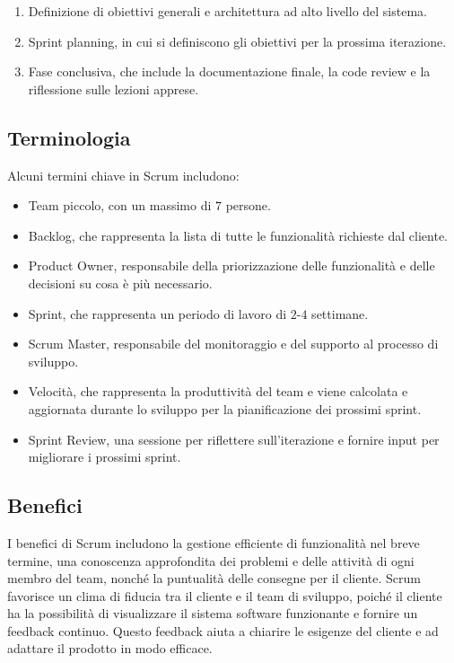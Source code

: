 \begin{enumerate}
    \item Definizione di obiettivi generali e architettura ad alto livello del sistema.
    \item Sprint planning, in cui si definiscono gli obiettivi per la prossima iterazione.
    \item Fase conclusiva, che include la documentazione finale, la code review e la riflessione sulle lezioni apprese.
\end{enumerate}

\subsection{Terminologia}
Alcuni termini chiave in Scrum includono:

\begin{itemize}
    \item Team piccolo, con un massimo di $7$ persone.
    \item Backlog, che rappresenta la lista di tutte le funzionalità richieste dal cliente.
    \item Product Owner, responsabile della priorizzazione delle funzionalità e delle decisioni su cosa è più necessario.
    \item Sprint, che rappresenta un periodo di lavoro di $2$-$4$ settimane.
    \item Scrum Master, responsabile del monitoraggio e del supporto al processo di sviluppo.
    \item Velocità, che rappresenta la produttività del team e viene calcolata e aggiornata durante lo sviluppo per la
    pianificazione dei prossimi sprint.
    \item Sprint Review, una sessione per riflettere sull'iterazione e fornire input per migliorare i prossimi sprint.
\end{itemize}

\subsection{Benefici}
I benefici di Scrum includono la gestione efficiente di funzionalità nel breve termine, una conoscenza approfondita
dei problemi e delle attività di ogni membro del team, nonché la puntualità delle consegne per il cliente. Scrum favorisce
un clima di fiducia tra il cliente e il team di sviluppo, poiché il cliente ha la possibilità di visualizzare il sistema software
funzionante e fornire un feedback continuo. Questo feedback aiuta a chiarire le esigenze del cliente e ad adattare il prodotto
in modo efficace.

